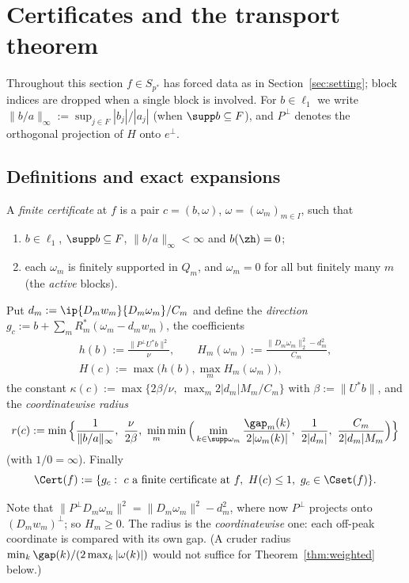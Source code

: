 \section{Certificates and the transport theorem}\label{sec:certificates}

Throughout this section $f\in S_{p^*}$ has forced data as in
Section~\ref{sec:setting}; block indices are dropped when a single block is
involved.  For $b\in\ell_1$ we write $\|b/a\|_\infty:=\sup_{j\in F}|b_j|/|a_j|$
(when $\supp b\subseteq F$), and $P^\perp$ denotes the orthogonal projection
of $H$ onto $e^\perp$.

\subsection{Definitions and exact expansions}

\begin{definition}\label{def:certificate}
A \emph{finite certificate} at $f$ is a pair $c=(b,\omega)$,
$\omega=(\omega_m)_{m\in I}$, such that
\begin{enumerate}
\item[(C1)] $b\in\ell_1$, $\supp b\subseteq F$, $\|b/a\|_\infty<\infty$ and
$b(\zh)=0$;
\item[(C2)] each $\omega_m$ is finitely supported in $Q_m$, and
$\omega_m=0$ for all but finitely many $m$ (the \emph{active} blocks).
\end{enumerate}
Put $d_m:=\ip{D_mw_m}{D_m\omega_m}/C_m$ and define the \emph{direction}
$g_c:=b+\sum_mR_m^*(\omega_m-d_mw_m)$, the coefficients
\begin{gather*}
 h(b):=\frac{\|P^\perp U^*b\|^2}{\nu},\qquad
 H_m(\omega_m):=\frac{\|D_m\omega_m\|_2^2-d_m^2}{C_m},\\
 H(c):=\max\big(h(b),\max_mH_m(\omega_m)\big),
\end{gather*}
the constant $\kappa(c):=\max\{2\beta/\nu,\ \max_m2|d_m|M_m/C_m\}$ with
$\beta:=\|U^*b\|$, and the \emph{coordinatewise radius}
\[
 r(c):=\min\Big\{\frac1{\|b/a\|_\infty},\ \frac\nu{2\beta},\
 \min_m\min\Big(\min_{k\in\supp\omega_m}\frac{\gap_m(k)}{2|\omega_m(k)|},\
 \frac1{2|d_m|},\ \frac{C_m}{2|d_m|M_m}\Big)\Big\}
\]
(with $1/0=\infty$).  Finally
\[
 \Cert(f):=\{g_c:\ c\text{ a finite certificate at }f,\ H(c)\le1,\ g_c\in\Cset(f)\}.
\]
\end{definition}

Note that $\|P^\perp D_m\omega_m\|^2=\|D_m\omega_m\|^2-d_m^2$, where now
$P^\perp$ projects onto $(D_mw_m)^\perp$; so $H_m\ge0$.  The radius is the
\emph{coordinatewise} one: each off-peak coordinate is compared with its own
gap.  (A cruder radius $\min_k\gap(k)/(2\max_k|\omega(k)|)$ would not suffice
for Theorem~\ref{thm:weighted} below.)

